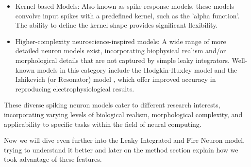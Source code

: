\begin{itemize}
    \item Kernel-based Models: Also known as spike-response models, these models convolve input spikes with a predefined kernel, such as the 'alpha function'. The ability to define the kernel shape provides significant flexibility.

    \item Higher-complexity neuroscience-inspired models: A wide range of more detailed neuron models exist, incorporating biophysical realism and/or morphological details that are not captured by simple leaky integrators. Well-known models in this category include the Hodgkin-Huxley model \cite{hodgkin1952quantitative} and the Izhikevich (or Resonator) model \cite{izhikevich2003simple}, which offer improved accuracy in reproducing electrophysiological results.
    
\end{itemize}

These diverse spiking neuron models cater to different research interests, incorporating varying levels of biological realism, morphological complexity, and applicability to specific tasks within the field of neural computing.

Now we will dive even further into the Leaky Integrated and Fire Neuron model, trying to understand it better and later on the method section explain how we took advantage of these features.
